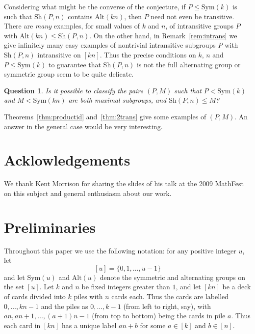 \documentclass[12pt]{amsart}
\newtheorem{qn}[thm]{Question}
\theoremstyle{remark}
\theoremstyle{definition}
\newcommand{\sym}{\mathrm{Sym}}
\newcommand{\alt}{\mathrm{Alt}}
\newcommand{\sh}{\mathrm{Sh}}
\begin{document}
Considering what might be the converse of the conjecture, if $P \leqslant \sym(k)$ is such that $\sh(P,n)$ contains $\alt(kn)$, then $P$ need not even be transitive. There are \emph{many} examples,  for small values of $k$ and $n$, of intransitive groups $P$ with  $\alt(kn)\leqslant \sh(P,n)$. On the other hand, in Remark~\ref{rem:intrans} we give infinitely many easy examples of nontrivial intransitive subgroups $P$ with $\sh(P,n)$  intransitive on $[kn]$.
Thus the precise conditions on $k$, $n$ and  $P \leqslant \sym(k)$ to guarantee that $\sh(P,n)$ is not the full alternating group or symmetric group seem to be quite delicate.

\begin{qn} 
Is it possible to classify the pairs $(P,M)$ such that $P<\sym(k)$ and $M<\sym(kn)$ are both maximal subgroups, and $\sh(P, n)\leq M$?
\end{qn}

Theorems~\ref{thm:productid} and~\ref{thm:2trans} give some examples of $(P,M)$. An answer in the general case would be very interesting.


\section*{Acklowledgements}
We thank Kent Morrison for sharing the slides of his talk at the 2009 MathFest on this subject and general enthusiasm about our work.

\section{Preliminaries}

Throughout this paper we use the following notation: for any positive integer $u$, let
$$ [u] = \{0, 1, \ldots, u-1\}$$
and let $\sym(u)$ and $\alt(u)$ denote the symmetric and alternating groups on the set $[u]$.
Let $k$ and $n$ be fixed integers greater than $1$, and let $[kn]$ be a deck of  cards divided into $k$ piles with $n$ cards each. Thus the cards are labelled  $0, \dots, kn-1$ and the piles as $0, \ldots, k-1$ (from left to right, say), with $an, an+1, \ldots, (a+1)n-1$ (from top to bottom) being the cards in pile $a$. Thus each card in $[kn]$ has a unique label $an+b$ for some $a \in [k]$ and $b \in [n]$.
\end{document}
